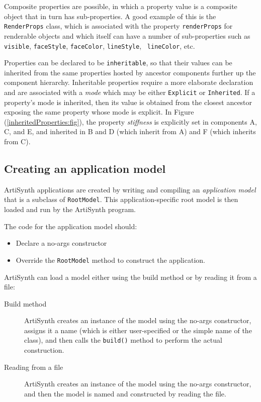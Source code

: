 Composite properties are possible, in which a property value is a
composite object that in turn has sub-properties. A good example of
this is the {\tt RenderProps} class, which is
associated with the property {\tt renderProps} for renderable objects
and which itself can have a number of sub-properties such as {\tt
visible}, {\tt faceStyle}, {\tt faceColor}, {\tt lineStyle}, {\tt
lineColor}, etc.

Properties can be declared to be {\tt inheritable}, so that their
values can be inherited from the same properties hosted by ancestor
components further up the component hierarchy. Inheritable properties
require a more elaborate declaration and are associated with a {\it
mode} which may be either {\tt Explicit} or {\tt Inherited}.  If a
property's mode is inherited, then its value is obtained from
the closest ancestor exposing the same property whose mode is
explicit. In Figure (\ref{inheritedProperties:fig}), the property {\it
stiffness} is explicitly set in components A, C, and E, and inherited
in B and D (which inherit from A) and F (which inherits from C).

\subsection{Creating an application model}
\label{CreatingAnApplication:sec}

ArtiSynth applications are created by writing and compiling
an {\it application model} that is a subclass of {\tt RootModel}.
This application-specific root model is then loaded and run by the
ArtiSynth program.

The code for the application model should:

\begin{itemize}

\item Declare a no-args constructor

\item Override the {\tt RootModel}
method to construct the application.

\end{itemize}

ArtiSynth can load a model either using the build method
or by reading it from a file:

\begin{description}

\item[Build method] \mbox{}

ArtiSynth creates an instance of the
model using the no-args constructor, assigns it a name
(which is either user-specified or the simple name of the class), and
then calls the {\tt build()} method to perform the actual
construction.

\item[Reading from a file] \mbox{}

ArtiSynth creates an instance of the
model using the no-args constructor, and then the model is named
and constructed by reading the file.

\end{description}

